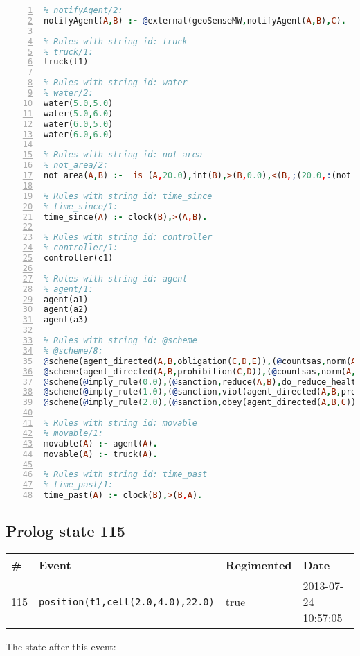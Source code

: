 \documentclass[11pt]{article}\usepackage[utf8]{inputenc}\usepackage{geometry}
\begin{document}
\begin{lstlisting}[language=Prolog, numbers=left]
% Rules with string id: notifyAgent
% notifyAgent/2:
notifyAgent(A,B) :- @external(geoSenseMW,notifyAgent(A,B),C).

% Rules with string id: truck
% truck/1:
truck(t1)

% Rules with string id: water
% water/2:
water(5.0,5.0)
water(5.0,6.0)
water(6.0,5.0)
water(6.0,6.0)

% Rules with string id: not_area
% not_area/2:
not_area(A,B) :-  is (A,20.0),int(B),>(B,0.0),<(B,;(20.0,:(not_area(A,B), is (-(B),20.0)))),int(A),>(A,0.0),<(A,;(20.0,:(area(A,B),-(int(A))))),int(B),>(A,0.0),>(B,0.0),<(A,21.0),<(B,21.0).

% Rules with string id: time_since
% time_since/1:
time_since(A) :- clock(B),>(A,B).

% Rules with string id: controller
% controller/1:
controller(c1)

% Rules with string id: agent
% agent/1:
agent(a1)
agent(a2)
agent(a3)

% Rules with string id: @scheme
% @scheme/8:
@scheme(agent_directed(A,B,obligation(C,D,E)),(@countsas,norm(A,B,F,obligation(C,D,E)),F),false,(listTrue(C)),(time_past(D)),false,[plus(viol(agent_directed(A,B,obligation(C,D,E))))|[]],[plus(obey(agent_directed(A,B,obligation(C,D,E))))|[]])
@scheme(agent_directed(A,B,prohibition(C,D)),(@countsas,norm(A,B,E,prohibition(C,D)),E),(listTrue(C)),false,(false),false,[plus(viol(agent_directed(A,B,prohibition(C,D))))|[]],[plus(obey(agent_directed(A,B,prohibition(C,D))))|[]])
@scheme(@imply_rule(0.0),(@sanction,reduce(A,B),do_reduce_health(A,B),notifyAgent(A,changed(status))),true,false,false,false,[min(reduce(A,B))|[]],[])
@scheme(@imply_rule(1.0),(@sanction,viol(agent_directed(A,B,prohibition(C,D))),do_sanction(D)),true,false,false,false,[min(viol(agent_directed(A,B,prohibition(C,D))))|[]],[])
@scheme(@imply_rule(2.0),(@sanction,obey(agent_directed(A,B,C))),true,false,false,false,[min(obey(agent_directed(A,B,C)))|[]],[])

% Rules with string id: movable
% movable/1:
movable(A) :- agent(A).
movable(A) :- truck(A).

% Rules with string id: time_past
% time_past/1:
time_past(A) :- clock(B),>(B,A).

\end{lstlisting}
\clearpage 
\subsection{Prolog state 115}
\begin{table}[ht]
\centering 
\begin{tabular}{l l l l} 
\textbf{\#} & \textbf{Event} & \textbf{Regimented} & \textbf{Date} \\ [0.5ex] 
\hline
115&\texttt{position(t1,cell(2.0,4.0),22.0)}&true&2013-07-24 10:57:05\\ [1ex] \hline\end{tabular}
\end{table}
The state after this event:
\end{document}
